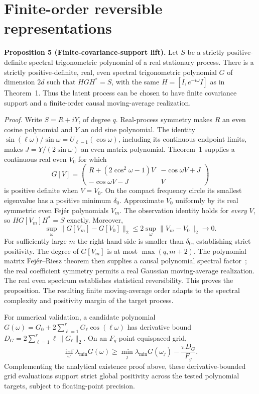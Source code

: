 \section{Finite-order reversible representations}\label{app:finiteorderR4}
\textbf{Proposition 5 (Finite-covariance-support lift).}
Let $S$ be a strictly positive-definite spectral trigonometric polynomial of a real stationary process. There is a strictly positive-definite, real, even spectral trigonometric polynomial $G$ of dimension $2d$ such that $HGH^*=S$, with the same $H=[I,e^{-i\omega}I]$ as in Theorem~1. Thus the latent process can be chosen to have finite covariance support and a finite-order causal moving-average realization.

\emph{Proof.} Write $S=R+iY$, of degree $q$. Real-process symmetry makes $R$ an even cosine polynomial and $Y$ an odd sine polynomial. The identity $\sin(\ell\omega)/\sin\omega=U_{\ell-1}(\cos\omega)$, including its continuous endpoint limits, makes $J=Y/(2\sin\omega)$ an even matrix polynomial. Theorem~1 supplies a continuous real even $V_0$ for which
\begin{equation}
 G[V]=\begin{pmatrix}
 R+(2\cos^2\omega-1)V&-\cos\omega V+J\\
 -\cos\omega V-J&V
 \end{pmatrix}
\end{equation}
is positive definite when $V=V_0$. On the compact frequency circle its smallest eigenvalue has a positive minimum $\delta_0$. Approximate $V_0$ uniformly by its real symmetric even Fej\'er polynomials $V_m$. The observation identity holds for \emph{every} $V$, so $HG[V_m]H^*=S$ exactly. Moreover,
\begin{equation}
 \sup_\omega\|G[V_m]-G[V_0]\|_2\le
 2\sup_\omega\|V_m-V_0\|_2\longrightarrow0.
\end{equation}
For sufficiently large $m$ the right-hand side is smaller than $\delta_0$, establishing strict positivity. The degree of $G[V_m]$ is at most $\max(q,m+2)$. The polynomial matrix Fej\'er--Riesz theorem then supplies a causal polynomial spectral factor~\cite{ephremidze2007,ephremidze2014}; the real coefficient symmetry permits a real Gaussian moving-average realization. The real even spectrum establishes statistical reversibility. This proves the proposition. The resulting finite moving-average order adapts to the spectral complexity and positivity margin of the target process.

For numerical validation, a candidate polynomial $G(\omega)=G_0+2\sum_{\ell=1}^{r}G_\ell\cos(\ell\omega)$ has derivative bound $D_G=2\sum_{\ell=1}^{r}\ell\|G_\ell\|_2$. On an $F_g$-point equispaced grid,
\begin{equation}
 \inf_\omega\lambda_{\min}G(\omega)\ge
 \min_j\lambda_{\min}G(\omega_j)-\frac{\pi D_G}{F_g}.
\end{equation}
Complementing the analytical existence proof above, these derivative-bounded grid evaluations support strict global positivity across the tested polynomial targets, subject to floating-point precision.


